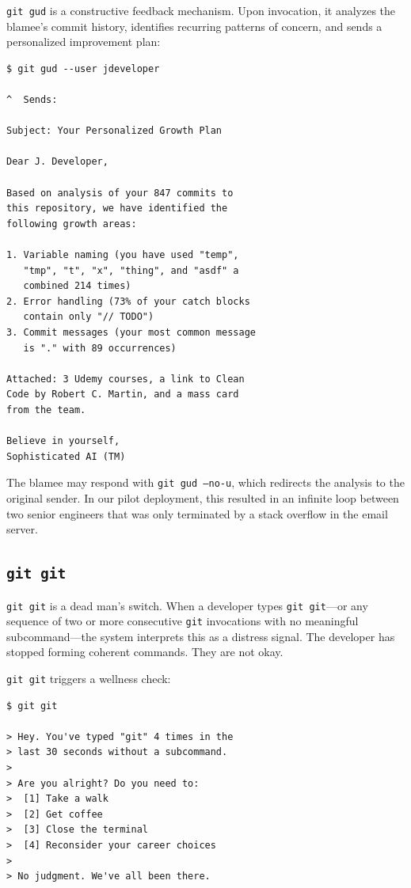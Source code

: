 \documentclass{sigtbd}
\begin{document}
\texttt{git gud} is a constructive feedback mechanism. Upon invocation, it analyzes the blamee's commit history, identifies recurring patterns of concern, and sends a personalized improvement plan:

\begin{lstlisting}
$ git gud --user jdeveloper

^  Sends:

Subject: Your Personalized Growth Plan

Dear J. Developer,

Based on analysis of your 847 commits to
this repository, we have identified the
following growth areas:

1. Variable naming (you have used "temp",
   "tmp", "t", "x", "thing", and "asdf" a
   combined 214 times)
2. Error handling (73% of your catch blocks
   contain only "// TODO")
3. Commit messages (your most common message
   is "." with 89 occurrences)

Attached: 3 Udemy courses, a link to Clean
Code by Robert C. Martin, and a mass card
from the team.

Believe in yourself,
Sophisticated AI (TM)
\end{lstlisting}

The blamee may respond with \texttt{git gud --no-u}, which redirects the analysis to the original sender. In our pilot deployment, this resulted in an infinite loop between two senior engineers that was only terminated by a stack overflow in the email server.

\subsection{\texttt{git git}}

\texttt{git git} is a dead man's switch. When a developer types \texttt{git git}---or any sequence of two or more consecutive \texttt{git} invocations with no meaningful subcommand---the system interprets this as a distress signal. The developer has stopped forming coherent commands. They are not okay.

\texttt{git git} triggers a wellness check:

\begin{lstlisting}
$ git git

> Hey. You've typed "git" 4 times in the
> last 30 seconds without a subcommand.
>
> Are you alright? Do you need to:
>  [1] Take a walk
>  [2] Get coffee
>  [3] Close the terminal
>  [4] Reconsider your career choices
>
> No judgment. We've all been there.
\end{lstlisting}
\end{document}
